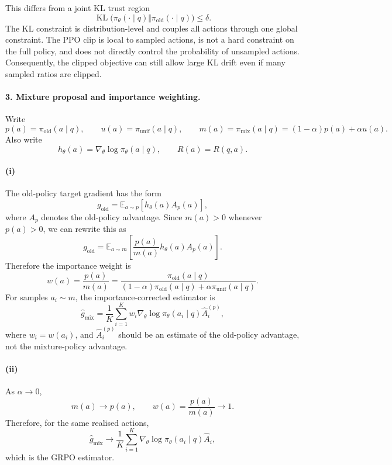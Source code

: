 This differs from a joint KL trust region
\[
\operatorname{KL}\bigl(\pi_\theta(\cdot\mid q)\Vert
\pi_{\mathrm{old}}(\cdot\mid q)\bigr)
\leq \delta.
\]
The KL constraint is distribution-level and couples all actions through one
global constraint. The PPO clip is local to sampled actions, is not a hard
constraint on the full policy, and does not directly control the probability of
unsampled actions. Consequently, the clipped objective can still allow large KL
drift even if many sampled ratios are clipped.

\paragraph{3. Mixture proposal and importance weighting.}

Write
\[
p(a)=\pi_{\mathrm{old}}(a\mid q),
\qquad
u(a)=\pi_{\mathrm{unif}}(a\mid q),
\qquad
m(a)=\pi_{\mathrm{mix}}(a\mid q)
=
(1-\alpha)p(a)+\alpha u(a).
\]
Also write
\[
h_\theta(a)=\nabla_\theta\log\pi_\theta(a\mid q),
\qquad
R(a)=R(q,a).
\]

\paragraph{(i)}
The old-policy target gradient has the form
\[
g_{\mathrm{old}}
=
\mathbb E_{a\sim p}
\left[
h_\theta(a)A_p(a)
\right],
\]
where \(A_p\) denotes the old-policy advantage. Since \(m(a)>0\) whenever
\(p(a)>0\), we can rewrite this as
\[
g_{\mathrm{old}}
=
\mathbb E_{a\sim m}
\left[
\frac{p(a)}{m(a)}
h_\theta(a)A_p(a)
\right].
\]
Therefore the importance weight is
\[
\boxed{
w(a)
=
\frac{p(a)}{m(a)}
=
\frac{
\pi_{\mathrm{old}}(a\mid q)
}{
(1-\alpha)\pi_{\mathrm{old}}(a\mid q)
+
\alpha \pi_{\mathrm{unif}}(a\mid q)
}.
}
\]
For samples \(a_i\sim m\), the importance-corrected estimator is
\[
\boxed{
\hat g_{\mathrm{mix}}
=
\frac{1}{K}
\sum_{i=1}^K
w_i
\nabla_\theta\log\pi_\theta(a_i\mid q)
\hat A_i^{(p)},
}
\]
where \(w_i=w(a_i)\), and \(\hat A_i^{(p)}\) should be an estimate of the
old-policy advantage, not the mixture-policy advantage.

\paragraph{(ii)}
As \(\alpha\to 0\),
\[
m(a)\to p(a),
\qquad
w(a)=\frac{p(a)}{m(a)}\to 1.
\]
Therefore, for the same realised actions,
\[
\hat g_{\mathrm{mix}}
\to
\frac{1}{K}
\sum_{i=1}^K
\nabla_\theta\log\pi_\theta(a_i\mid q)
\hat A_i,
\]
which is the GRPO estimator.

